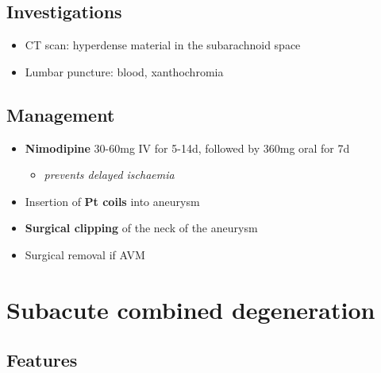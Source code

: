 \documentclass[
  12pt,
]{memoir}
\providecommand{\tightlist}{%
  \setlength{\itemsep}{0pt}\setlength{\parskip}{0pt}}
\begin{document}
\hypertarget{investigations-4}{%
\subsection{Investigations}\label{investigations-4}}

\begin{itemize}
\tightlist
\item
  CT scan: hyperdense material in the subarachnoid space
\item
  Lumbar puncture: blood, xanthochromia
\end{itemize}

\hypertarget{management-3}{%
\subsection{Management}\label{management-3}}

\begin{itemize}
\tightlist
\item
  \textbf{Nimodipine} 30-60mg IV for 5-14d, followed by 360mg oral for
  7d

  \begin{itemize}
  \tightlist
  \item
    \emph{prevents delayed ischaemia}
  \end{itemize}
\item
  Insertion of \textbf{Pt coils} into aneurysm
\item
  \textbf{Surgical clipping} of the neck of the aneurysm
\item
  Surgical removal if AVM
\end{itemize}

\hypertarget{subacute-combined-degeneration}{%
\section{Subacute combined
degeneration}\label{subacute-combined-degeneration}}

\hypertarget{features-7}{%
\subsection{Features}\label{features-7}}
\end{document}
